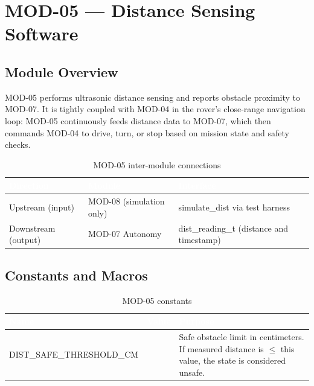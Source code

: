 \documentclass[12pt,a4paper]{article}
\newcommand{\theadtext}[1]{\textcolor{white}{\textbf{#1}}}
\newcommand{\fn}[1]{{\footnotesize\ttfamily #1}}
\begin{document}
\section{MOD-05 --- Distance Sensing Software}

\subsection{Module Overview}

MOD-05 performs ultrasonic distance sensing and reports obstacle proximity to
MOD-07. It is tightly coupled with MOD-04 in the rover's close-range navigation
loop: MOD-05 continuously feeds distance data to MOD-07, which then commands
MOD-04 to drive, turn, or stop based on mission state and safety checks.

\begin{table}[H]
\centering\small
\begin{tabularx}{\textwidth}{L{2.8cm} L{2.8cm} X}
\toprule
{}
\theadtext{Direction} & \theadtext{Module} & \theadtext{Interface} \\
\midrule
{}   Upstream (input)    & MOD-08 (simulation only) & \fn{simulate\_dist} via test harness \\
 Downstream (output) & MOD-07 Autonomy & \fn{dist\_reading\_t} (distance and timestamp) \\
\bottomrule
\end{tabularx}
\caption{MOD-05 inter-module connections}
\end{table}

\subsection{Constants and Macros}

\begin{table}[H]
\centering\small
\begin{tabularx}{\textwidth}{L{5.5cm} L{2cm} X}
\toprule
{}
\theadtext{Name} & \theadtext{Value} & \theadtext{Purpose} \\
\midrule
{}   \fn{DIST\_SAFE\_THRESHOLD\_CM} & \fn{15} & Safe obstacle limit in centimeters. If measured distance is $\leq$ this value, the state is considered unsafe. \\
\bottomrule
\end{tabularx}
\caption{MOD-05 constants}
\end{table}
\end{document}
